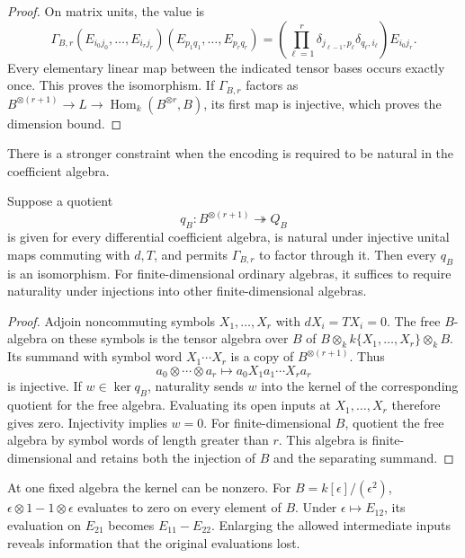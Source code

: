 \begin{proof}
On matrix units, the value is
\[
 \Gamma_{B,r}(E_{i_0j_0},\ldots,E_{i_rj_r})
       (E_{p_1q_1},\ldots,E_{p_rq_r})
 =\left(\prod_{\ell=1}^r
        \delta_{j_{\ell-1},p_\ell}\delta_{q_\ell,i_\ell}\right)
         E_{i_0j_r}.
\]
Every elementary linear map between the indicated tensor bases
occurs exactly once. This proves the isomorphism. If
\(\Gamma_{B,r}\) factors as \(B^{\otimes(r+1)}\to L\to
\operatorname{Hom}_k(B^{\otimes r},B)\), its first map is
injective, which proves the dimension bound.
\end{proof}

There is a stronger constraint when the encoding is required
to be natural in the coefficient algebra.

\begin{proposition}
\label{v4-prop:regular-natural-context}
Suppose a quotient
\[
 q_B:B^{\otimes(r+1)}\twoheadrightarrow Q_B
\]
is given for every differential coefficient algebra, is natural
under injective unital maps commuting with \(d,T\), and permits
\(\Gamma_{B,r}\) to factor through it. Then every \(q_B\) is
an isomorphism. For finite-dimensional ordinary algebras, it
suffices to require naturality under injections into other
finite-dimensional algebras.
\end{proposition}

\begin{proof}
Adjoin noncommuting symbols \(X_1,\ldots,X_r\) with
\(dX_i=TX_i=0\). The free \(B\)-algebra on these symbols is
the tensor algebra over \(B\) of
\(B\otimes_k k\{X_1,\ldots,X_r\}\otimes_k B\).
Its summand with symbol word \(X_1\cdots X_r\) is a copy
of \(B^{\otimes(r+1)}\). Thus
\[
 a_0\otimes\cdots\otimes a_r
       \longmapsto a_0X_1a_1\cdots X_ra_r
\]
is injective. If \(w\in\ker q_B\), naturality sends \(w\)
into the kernel of the corresponding quotient for the free
algebra. Evaluating its open inputs at \(X_1,\ldots,X_r\)
therefore gives zero. Injectivity implies \(w=0\).
For finite-dimensional \(B\), quotient the free algebra by
symbol words of length greater than \(r\). This algebra is
finite-dimensional and retains both the injection of \(B\)
and the separating summand.
\end{proof}

At one fixed algebra the kernel can be nonzero.
For \(B=k[\epsilon]/(\epsilon^2)\),
\(\epsilon\otimes1-1\otimes\epsilon\) evaluates to zero
on every element of \(B\). Under
\(\epsilon\mapsto E_{12}\), its evaluation on \(E_{21}\)
becomes \(E_{11}-E_{22}\). Enlarging the allowed intermediate
inputs reveals information that the original evaluations lost.

